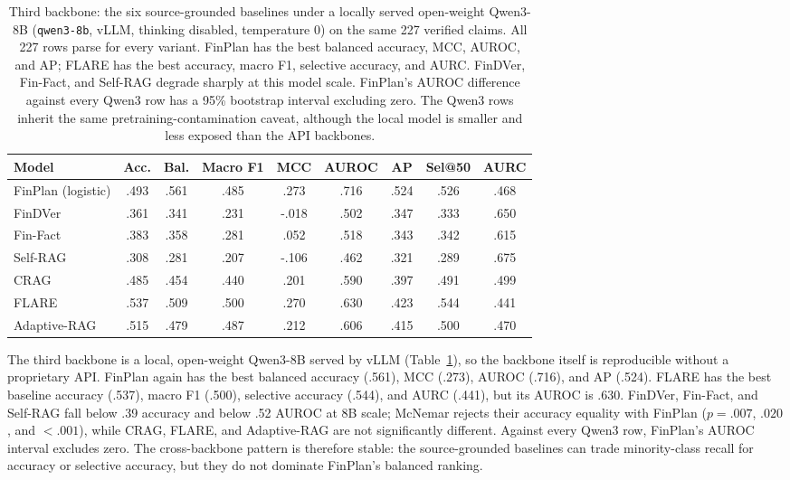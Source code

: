 \documentclass[11pt]{article}
\begin{document}
\begin{table}[t]
\centering
\small
\setlength{\tabcolsep}{3pt}
\begin{tabular}{lcccccccc}
\toprule
Model & Acc. & Bal. & Macro F1 & MCC & AUROC & AP & Sel@50 & AURC \\
\midrule
FinPlan (logistic) & .493 & .561 & .485 & .273 & .716 & .524 & .526 & .468 \\
FinDVer & .361 & .341 & .231 & -.018 & .502 & .347 & .333 & .650 \\
Fin-Fact & .383 & .358 & .281 & .052 & .518 & .343 & .342 & .615 \\
Self-RAG & .308 & .281 & .207 & -.106 & .462 & .321 & .289 & .675 \\
CRAG & .485 & .454 & .440 & .201 & .590 & .397 & .491 & .499 \\
FLARE & .537 & .509 & .500 & .270 & .630 & .423 & .544 & .441 \\
Adaptive-RAG & .515 & .479 & .487 & .212 & .606 & .415 & .500 & .470 \\
\bottomrule
\end{tabular}
\caption{Third backbone: the six source-grounded baselines under a locally
served open-weight Qwen3-8B (\texttt{qwen3-8b}, vLLM, thinking disabled,
temperature 0) on the same 227 verified claims. All 227 rows parse for every
variant. FinPlan has the best balanced accuracy, MCC, AUROC, and AP; FLARE has
the best accuracy, macro F1, selective accuracy, and AURC. FinDVer, Fin-Fact,
and Self-RAG degrade sharply at this model scale. FinPlan's AUROC difference
against every Qwen3 row has a 95\% bootstrap interval excluding zero. The Qwen3
rows inherit the same pretraining-contamination caveat, although the local
model is smaller and less exposed than the API backbones.}
\label{tab:metrics-qwen}
\end{table}

The third backbone is a local, open-weight Qwen3-8B \citep{qwen2025qwen3}
served by vLLM (Table~\ref{tab:metrics-qwen}), so the backbone itself is
reproducible without a proprietary API. FinPlan again has the best balanced
accuracy (.561), MCC (.273), AUROC (.716), and AP (.524). FLARE has the best
baseline accuracy (.537), macro F1 (.500), selective accuracy (.544), and AURC
(.441), but its AUROC is .630. FinDVer, Fin-Fact, and Self-RAG fall below .39
accuracy and below .52 AUROC at 8B scale; McNemar rejects their accuracy
equality with FinPlan ($p=.007$, $.020$, and $<.001$), while CRAG, FLARE, and
Adaptive-RAG are not significantly different. Against every Qwen3 row,
FinPlan's AUROC interval excludes zero. The cross-backbone pattern is therefore
stable: the source-grounded baselines can trade minority-class recall for
accuracy or selective accuracy, but they do not dominate FinPlan's balanced
ranking.
\end{document}
